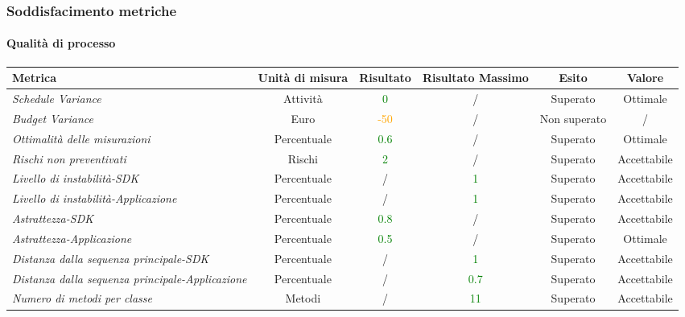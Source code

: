 \subsubsection{Soddisfacimento metriche}

\paragraph{Qualità di processo}
\begin{longtable}{|>{\centering}m{5cm}|c|c|c|c|c|}
\hline
\textbf{Metrica} & \textbf{Unità di misura} & \textbf{Risultato} & \textbf{Risultato Massimo} & \textbf{Esito} & \textbf{Valore}\\
\hline
\endhead

\emph{Schedule Variance} & {Attività} & \textcolor{Green}{0} & / & Superato & Ottimale\\ \hline
\emph{Budget Variance} & {Euro} & \textcolor{Orange}{-50} & / & Non superato & /\\ \hline
\emph{Ottimalità delle misurazioni} & {Percentuale} & \textcolor{Green}{0.6} & / & Superato & Ottimale \\ \hline
\emph{Rischi non preventivati} & {Rischi} & \textcolor{Green}{2} & / & Superato & Accettabile\\ \hline
\emph{Livello di instabilità-SDK} & {Percentuale} & / &\textcolor{Green}{1} & Superato & Accettabile\\ \hline
\emph{Livello di instabilità-Applicazione} & {Percentuale} & / &\textcolor{Green}{1} & Superato & Accettabile\\ \hline
\emph{Astrattezza-SDK} & {Percentuale} & \textcolor{Green}{0.8} & / & Superato & Accettabile\\ \hline
\emph{Astrattezza-Applicazione} & {Percentuale} & \textcolor{Green}{0.5} & / & Superato & Ottimale\\ \hline
\emph{Distanza dalla sequenza principale-SDK} & {Percentuale} & / &\textcolor{Green}{1} & Superato & Accettabile\\ \hline
\emph{Distanza dalla sequenza principale-Applicazione} & {Percentuale} & / &\textcolor{Green}{0.7} & Superato & Accettabile\\ \hline
\emph{Numero di metodi per classe} & {Metodi} & / &\textcolor{Green}{11} & Superato & Accettabile\\ \hline

\end{longtable}
